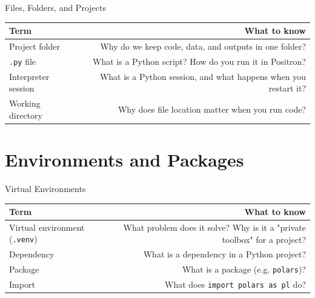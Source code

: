 \documentclass[9pt,aspectratio=169]{beamer}
\begin{document}
\begin{frame}{Files, Folders, and Projects}

\begin{tabular}{@{}lR@{}}
\toprule
\textbf{Term} & \textbf{What to know} \\
\midrule
\alert{Project folder} & Why do we keep code, data, and outputs in one folder? \\[0.8em]
\alert{\texttt{.py} file} & What is a Python script? How do you run it in Positron? \\[0.8em]
\alert{Interpreter session} & What is a Python session, and what happens when you restart it? \\[0.8em]
\alert{Working directory} & Why does file location matter when you run code? \\
\bottomrule
\end{tabular}

\end{frame}


\section{Environments and Packages}

\begin{frame}{Virtual Environments}

\begin{tabular}{@{}lR@{}}
\toprule
\textbf{Term} & \textbf{What to know} \\
\midrule
\alert{Virtual environment (\texttt{.venv})} & What problem does it solve? Why is it a "private toolbox" for a project? \\[0.8em]
\alert{Dependency} & What is a dependency in a Python project? \\[0.8em]
\alert{Package} & What is a package (e.g. \texttt{polars})? \\[0.8em]
\alert{Import} & What does \texttt{import polars as pl} do? \\
\bottomrule
\end{tabular}

\end{frame}
\end{document}
